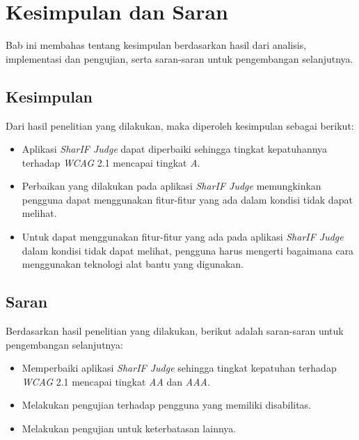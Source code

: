\chapter{Kesimpulan dan Saran}
\label{chap:kesimpulan_dan_saran}

Bab ini membahas tentang kesimpulan berdasarkan hasil dari analisis, implementasi dan pengujian, serta saran-saran untuk pengembangan selanjutnya.

\section{Kesimpulan}
\label{sec:kesimpulan}
Dari hasil penelitian yang dilakukan, maka diperoleh kesimpulan sebagai berikut:
\begin{itemize}
	\item Aplikasi \textit{SharIF Judge} dapat diperbaiki sehingga tingkat kepatuhannya terhadap \textit{WCAG} 2.1 mencapai tingkat \textit{A}.
	\item Perbaikan yang dilakukan pada aplikasi \textit{SharIF Judge} memungkinkan pengguna dapat menggunakan fitur-fitur yang ada dalam kondisi tidak dapat melihat.
	\item Untuk dapat menggunakan fitur-fitur yang ada pada aplikasi \textit{SharIF Judge} dalam kondisi tidak dapat melihat, pengguna harus mengerti bagaimana cara menggunakan teknologi alat bantu yang digunakan.
\end{itemize}

\section{Saran}
\label{sec:saran}
Berdasarkan hasil penelitian yang dilakukan, berikut adalah saran-saran untuk pengembangan selanjutnya:
\begin{itemize}
	\item Memperbaiki aplikasi \textit{SharIF Judge} sehingga tingkat kepatuhan terhadap \textit{WCAG} 2.1 mencapai tingkat \textit{AA} dan \textit{AAA}.
	\item Melakukan pengujian terhadap pengguna yang memiliki disabilitas.
	\item Melakukan pengujian untuk keterbatasan lainnya.
\end{itemize}